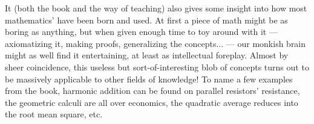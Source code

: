 It (both the book and the way of teaching) also gives some insight into how most mathematics' have been born and used. At first a piece of math might be as boring as anything, but when given enough time to toy around with it --- axiomatizing it, making proofs, generalizing the concepts... --- our monkish brain might as well find it entertaining, at least as intellectual foreplay. Almost by sheer coincidence, this useless but sort-of-interesting blob of concepts turns out to be massively applicable to other fields of knowledge! To name a few examples from the book, harmonic addition can be found on parallel resistors' resistance, the geometric calculi are all over economics, the quadratic average reduces into the root mean square, etc.
